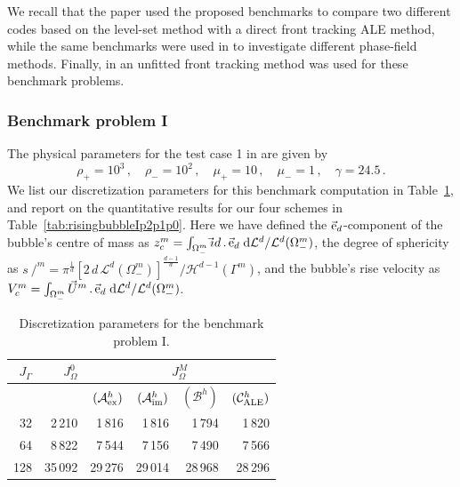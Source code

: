 \documentclass[a4paper,12pt,onecolumn]{article}
\newcommand{\vol}{\mathcal{L}^d}
\newcommand{\surfvol}{\mathcal{H}^{d-1}}
\newcommand{\dL}[1]{\;{\rm d}{\cal L}^{#1}} %
\newcommand{\id}{\rm id}
\newcommand{\strikes}{\mbox{$s\!\!\!\!\:/$}}
\newcommand{\schemeAex}{{\mathcal{A}^h_{\rm ex}}}
\newcommand{\schemeAim}{{\mathcal{A}^h_{\rm im}}}
\newcommand{\schemeB}{{\mathcal{B}^h}}
\newcommand{\schemeALE}{{\mathcal{C}^h_{\rm ALE}}}
\newcommand{\ek}{{\rm e}}
\begin{document}
We recall that the paper \cite{HysingTKPBGT09} used the proposed benchmarks to
compare two different codes based on the level-set method with a direct front
tracking ALE method, while the same benchmarks were used in 
\cite{AlandV12,GarckeHK16} to
investigate different phase-field methods. Finally, 
in \cite{fluidfbp} an unfitted
front tracking method was used for these benchmark problems. 

\subsubsection{Benchmark problem I}
The physical parameters for the test case 1 in \cite[Table~I]{HysingTKPBGT09}
are given by
\begin{equation} \label{eq:Hysing1}
\rho_+ = 10^3\,,\quad \rho_- = 10^2\,,\quad \mu_+ = 10\,,\quad \mu_- = 1\,,\quad
\gamma = 24.5\,.
\end{equation}
We list our discretization parameters for this benchmark computation
in Table~\ref{tab:risingbubble2Delements}, and report on the quantitative
results for our four schemes in Table~\ref{tab:risingbubbleIp2p1p0}.
Here we have defined the $\vec\ek_d$-component of the bubble's centre of mass
as $z_c^m = \int_{\Omega_-^m} \vec\id\,.\,\vec\ek_d \dL{d} / \vol(\Omega_-^m)$,
the degree of sphericity as
$\strikes^m ={\pi^{\frac{1}{d}}[2\,d\,\vol(\Omega_-^m)]^\frac{d-1}{d}}/
{\surfvol(\Gamma^m)}$, and the bubble's rise velocity as
$V^m_c = \int_{\Omega_-^m}\vec U^m\,.\,\vec\ek_d \dL{d} / \vol(\Omega_-^m)$.
\begin{table}
\center
\begin{tabular}{rrrrrr}
\hline
$J_\Gamma$ & $J_\Omega^0$ & \multicolumn{4}{c}{$J_\Omega^M$} \\ \hline
& & $(\schemeAex)$ & $(\schemeAim)$ & $(\schemeB)$ & $(\schemeALE)$ \\
\hline
 32 &  2\,210 &  1\,816 &  1\,816 &  1\,794 &  1\,820 \\
 64 &  8\,822 &  7\,544 &  7\,156 &  7\,490 &  7\,566 \\
128 & 35\,092 & 29\,276 & 29\,014 & 28\,968 & 28\,296 \\
\hline
\end{tabular}
\caption{Discretization parameters for the benchmark problem I.}
\label{tab:risingbubble2Delements}
\end{table}%
\end{document}
